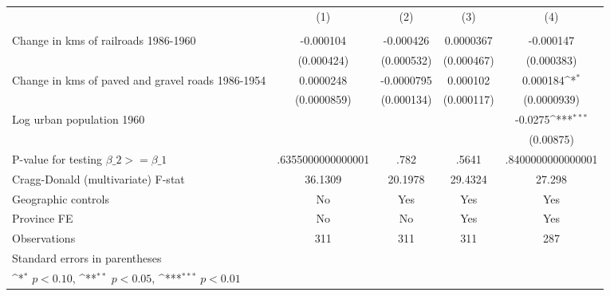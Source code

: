 {
\def\sym#1{\ifmmode^{#1}\else\(^{#1}\)\fi}
\begin{tabular}{l*{4}{c}}
\hline\hline
                &\multicolumn{1}{c}{(1)}&\multicolumn{1}{c}{(2)}&\multicolumn{1}{c}{(3)}&\multicolumn{1}{c}{(4)}\\
                &\multicolumn{1}{c}{}&\multicolumn{1}{c}{}&\multicolumn{1}{c}{}&\multicolumn{1}{c}{}\\
\hline
Change in kms of railroads 1986-1960&-0.000104         &-0.000426         &0.0000367         &-0.000147         \\
                &(0.000424)         &(0.000532)         &(0.000467)         &(0.000383)         \\
[1em]
Change in kms of paved and gravel roads 1986-1954&0.0000248         &-0.0000795         & 0.000102         & 0.000184\sym{*}  \\
                &(0.0000859)         &(0.000134)         &(0.000117)         &(0.0000939)         \\
[1em]
Log urban population 1960&                  &                  &                  &  -0.0275\sym{***}\\
                &                  &                  &                  &(0.00875)         \\
\hline
P-value for testing $\beta\_{2} >= \beta\_{1}$&.6355000000000001         &     .782         &    .5641         &.8400000000000001         \\
Cragg-Donald (multivariate) F-stat&  36.1309         &  20.1978         &  29.4324         &   27.298         \\
Geographic controls&       No         &      Yes         &      Yes         &      Yes         \\
Province FE     &       No         &       No         &      Yes         &      Yes         \\
Observations    &      311         &      311         &      311         &      287         \\
\hline\hline
\multicolumn{5}{l}{\footnotesize Standard errors in parentheses}\\
\multicolumn{5}{l}{\footnotesize \sym{*} \(p<0.10\), \sym{**} \(p<0.05\), \sym{***} \(p<0.01\)}\\
\end{tabular}
}
